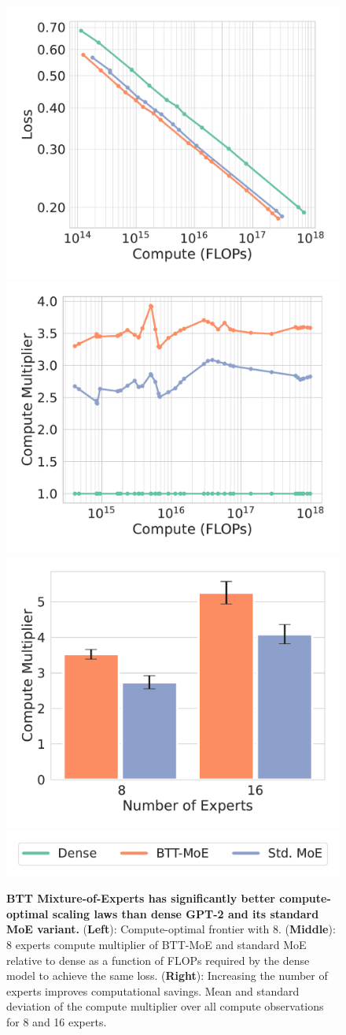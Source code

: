 \documentclass{article}
\begin{document}
\begin{figure}[!t]
\centering
    \includegraphics[height=0.26\linewidth]{figs/moe_scaling_loss_8.pdf}
    \includegraphics[height=0.26\linewidth]{figs/moe_compute_mul_across_loss_8.pdf}
    \label{fig:compute_mult}
    \includegraphics[height=0.26\linewidth]{figs/compute_moe_summary.pdf}
    \label{fig:agg_compute_mult}
    \vspace{-2mm}
    \\
    \includegraphics[scale=0.35]{figs/moe_compute_mul_across_loss_legend.pdf}
    \vspace{-2mm}
   \caption{
   \textbf{BTT Mixture-of-Experts has significantly better compute-optimal scaling laws than dense GPT-2 and its standard MoE variant.} (\textbf{Left}):
   Compute-optimal frontier with $8$.
   (\textbf{Middle}): 8 experts compute multiplier of BTT-MoE and standard MoE relative to dense as a function of FLOPs required by the dense model to achieve the same loss.
   (\textbf{Right}): Increasing the number of experts improves computational savings.
   Mean and standard deviation of the compute multiplier
   over all compute observations for 8 and 16 experts.
   }
    \label{fig:moe}
    \vspace{-4mm}
\end{figure}
\end{document}
